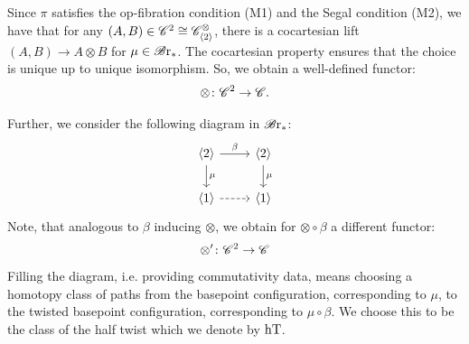 \begin{const}
\begin{center}
\end{center}

Since $\pi$ satisfies the op-fibration condition (M1) and the Segal condition
(M2), we have that for any $(A,B) \in \mathscr{C}^2 \cong \mathscr{C}^{\otimes}_{\langle 2 \rangle}$,
there is a cocartesian lift $(A,B) \to A \otimes B$ for $\mu \in \mathscr{B} \text{r}_{\ast}$. The
cocartesian property ensures that the choice is unique up to unique isomorphism.
So, we obtain a well-defined functor:
\[
    \otimes \colon \mathscr{C}^2 \to \mathscr{C}.
\]

Further, we consider the following diagram in $\mathscr{B} \text{r}_{\ast}$:
\[    
    \begin{tikzcd}
        \langle 2 \rangle \arrow[r, "\beta"] \arrow[d, "\mu"] & \langle 2 \rangle \arrow[d, "\mu"] \\
        \langle 1 \rangle  \arrow[r, dashed]                  & \langle 1 \rangle                
    \end{tikzcd}
\]
Note, that analogous to $\beta$ inducing $\otimes$, we obtain for $\otimes \circ
\beta$ a different functor:
\[
    \otimes' \colon \mathscr{C}^2 \to \mathscr{C}
\]
Filling the diagram, i.e. providing commutativity data, means choosing a homotopy
class of paths from the basepoint configuration, corresponding to $\mu$, to the
twisted basepoint configuration, corresponding to $\mu \circ \beta$. We choose
this to be the class of the half twist which we denote by $\operatorname{hT}$.

\begin{center}
\end{center}
\end{const}
